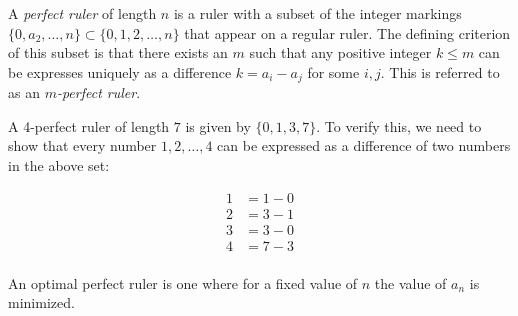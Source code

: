 \documentclass[12pt]{article}
\begin{document}
A \emph{perfect ruler} of length $n$ is a ruler with a subset of the integer markings  $\{0,a_2,\ldots,n\}\subset\{0,1,2,\ldots,n\}$ that appear on a regular ruler.  The defining criterion of this subset is that there exists an $m$ such that any positive integer $k\leq m$ can be expresses uniquely as a difference $k=a_i-a_j$ for some $i,j$.  This is referred to as an \emph{$m$-perfect ruler}.

A 4-perfect ruler of length $7$ is given by $\{0,1,3,7\}$.  To verify this, we need to show that every number $1,2,\ldots,4$ can be expressed as a difference of two numbers in the above set:

\begin{align*}
1&=1-0\\
2&=3-1\\
3&=3-0\\
4&=7-3\\
\end{align*}

An optimal perfect ruler is one where for a fixed value of $n$ the value of $a_n$ is minimized.
\end{document}

